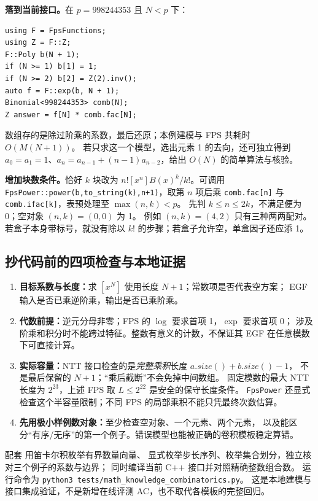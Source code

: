 \textbf{落到当前接口。}在 $p=998244353$ 且 $N<p$ 下：
\begin{lstlisting}
using F = FpsFunctions;
using Z = F::Z;
F::Poly b(N + 1);
if (N >= 1) b[1] = 1;
if (N >= 2) b[2] = Z(2).inv();
auto f = F::exp(b, N + 1);
Binomial<998244353> comb(N);
Z answer = f[N] * comb.fac[N];
\end{lstlisting}
数组存的是除过阶乘的系数，最后还原；本例建模与 FPS 共耗时 $O(M(N+1))$。
若只求这一个模型，选出元素 1 的去向，还可独立得到
$a_0=a_1=1$、$a_n=a_{n-1}+(n-1)a_{n-2}$，给出 $O(N)$ 的简单算法与核验。

\textbf{增加块数条件。}恰好 $k$ 块改为
$n![x^n]B(x)^k/k!$。可调用
\texttt{FpsPower::power(b,to\_string(k),n+1)}，取第 $n$ 项后乘
\texttt{comb.fac[n]} 与 \texttt{comb.ifac[k]}，表预处理至 $\max(n,k)<p$。
先判 $k\le n\le2k$，不满足便为 0；空对象 $(n,k)=(0,0)$ 为 1。
例如 $(n,k)=(4,2)$ 只有三种两两配对。
若盒子本身带标号，就没有除以 $k!$ 的步骤；若盒子允许空，单盒因子还应添 1。

\subsection{抄代码前的四项检查与本地证据}
\begin{enumerate}
\item \textbf{目标系数与长度：}求 $[x^N]$ 使用长度 $N+1$；常数项是否代表空方案；
EGF 输入是否已乘逆阶乘，输出是否已乘阶乘。
\item \textbf{代数前提：}逆元分母非零；FPS 的 $\log$ 要求首项 1，$\exp$ 要求首项 0；
涉及阶乘和积分时不能跨过特征。整数有意义的计数，不保证其 EGF 在任意模数下可直接计算。
\item \textbf{实际容量：}NTT 接口检查的是\emph{完整乘积}长度 $a.size()+b.size()-1$，
不是最后保留的 $N+1$；“乘后截断”不会免掉中间数组。
固定模数的最大 NTT 长度为 $2^{23}$，上述 FPS 取 $L\le2^{22}$ 是安全的保守长度条件。
\texttt{FpsPower} 还显式检查这个半容量限制；不同 FPS 的局部乘积不能只凭最终次数估算。
\item \textbf{先用极小样例数对象：}至少检查空对象、一个元素、两个元素，
以及能区分“有序/无序”的第一个例子。错误模型也能被正确的卷积模板稳定算错。
\end{enumerate}

配套  用笛卡尔积枚举有界数量向量、
显式枚举步长序列、枚举集合划分，独立核对三个例子的系数与边界；
同时编译当前 C++ 接口并对照精确整数组合数。
运行命令为 \texttt{python3 tests/math\_knowledge\_combinatorics.py}。
这是本地建模与接口集成验证，不是新增在线评测 AC，也不取代各模板的完整回归。

